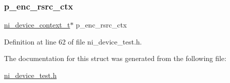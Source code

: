 \subsubsection{\texorpdfstring{p\_enc\_rsrc\_ctx}{p\_enc\_rsrc\_ctx}}
{\footnotesize\ttfamily \mbox{\hyperlink{ni__rsrc__api_8h_a880a361e6e867b45d102656e813a046f}{ni\+\_\+device\+\_\+context\+\_\+t}}$\ast$ p\+\_\+enc\+\_\+rsrc\+\_\+ctx}



Definition at line 62 of file ni\+\_\+device\+\_\+test.\+h.



The documentation for this struct was generated from the following file\+:\begin{DoxyCompactItemize}
\item 
\mbox{\hyperlink{ni__device__test_8h}{ni\+\_\+device\+\_\+test.\+h}}\end{DoxyCompactItemize}
